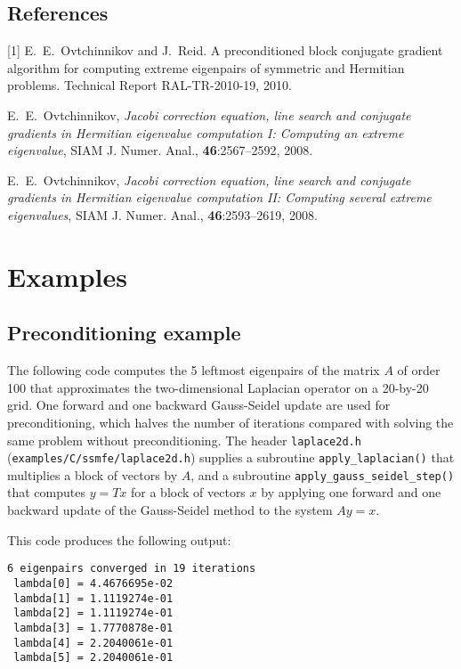 \subsection*{References}

[1]
E.~E.~Ovtchinnikov and J.~Reid.
A preconditioned block conjugate gradient
algorithm for computing extreme eigenpairs
of symmetric and Hermitian problems.
Technical Report RAL-TR-2010-19, 2010.

\noindent
[2]
E.~E.~Ovtchinnikov,
{\em Jacobi correction equation, line search and
conjugate gradients in Hermitian eigenvalue computation I:
Computing an extreme eigenvalue},
SIAM J. Numer. Anal., {\bf 46}:2567--2592, 2008.

\noindent
[3]
E.~E.~Ovtchinnikov,
{\em Jacobi correction equation, line search and
conjugate gradients in Hermitian eigenvalue computation II:
Computing several extreme eigenvalues},
SIAM J. Numer. Anal., {\bf 46}:2593--2619, 2008.

\section{Examples}

\subsection{Preconditioning example}
\label{ssmfe:example:precond}

The following code 
computes the 5 leftmost eigenpairs of 
the matrix $A$ of order 100 that approximates 
the two-dimensional Laplacian operator
on a 20-by-20 grid.
One forward and one backward Gauss-Seidel update
are used for preconditioning,
which halves the number of iterations
compared with solving the same problem without preconditioning.
The header {\tt laplace2d.h} (\texttt{examples/C/ssmfe/laplace2d.h})
supplies a subroutine {\tt apply\_laplacian()}
that multiplies a block of vectors by $A$,
and a subroutine 
{\tt apply\_gauss\_seidel\_step()}
that computes $y = T x$ for a block of vectors $x$
by applying one forward and one backward update
of the Gauss-Seidel method to the system $A y = x$.

This code produces the following output:
\begin{verbatim}
6 eigenpairs converged in 19 iterations
 lambda[0] = 4.4676695e-02
 lambda[1] = 1.1119274e-01
 lambda[2] = 1.1119274e-01
 lambda[3] = 1.7770878e-01
 lambda[4] = 2.2040061e-01
 lambda[5] = 2.2040061e-01
\end{verbatim}

